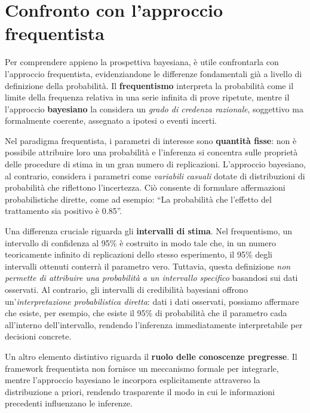 \documentclass[
  letterpaper,
  DIV=11,
  numbers=noendperiod,
  oneside]{scrreprt}
\theoremstyle{definition}
\theoremstyle{plain}
\theoremstyle{definition}
\theoremstyle{remark}
\begin{document}
\section{Confronto con l'approccio
frequentista}\label{confronto-con-lapproccio-frequentista}

Per comprendere appieno la prospettiva bayesiana, è utile confrontarla
con l'approccio frequentista, evidenziandone le differenze fondamentali
già a livello di definizione della probabilità. Il \textbf{frequentismo}
interpreta la probabilità come il limite della frequenza relativa in una
serie infinita di prove ripetute, mentre il l'approccio
\textbf{bayesiano} la considera un \emph{grado di credenza razionale},
soggettivo ma formalmente coerente, assegnato a ipotesi o eventi
incerti.

Nel paradigma frequentista, i parametri di interesse sono
\textbf{quantità fisse}: non è possibile attribuire loro una probabilità
e l'inferenza si concentra sulle proprietà delle procedure di stima in
un gran numero di replicazioni. L'approccio bayesiano, al contrario,
considera i parametri come \emph{variabili casuali} dotate di
distribuzioni di probabilità che riflettono l'incertezza. Ciò consente
di formulare affermazioni probabilistiche dirette, come ad esempio: ``La
probabilità che l'effetto del trattamento sia positivo è 0.85''.

Una differenza cruciale riguarda gli \textbf{intervalli di stima}. Nel
frequentismo, un intervallo di confidenza al 95\% è costruito in modo
tale che, in un numero teoricamente infinito di replicazioni dello
stesso esperimento, il 95\% degli intervalli ottenuti conterrà il
parametro vero. Tuttavia, questa definizione \emph{non permette di
attribuire una probabilità a un intervallo specifico} basandosi sui dati
osservati. Al contrario, gli intervalli di credibilità bayesiani offrono
un'\emph{interpretazione probabilistica diretta}: dati i dati osservati,
possiamo affermare che esiste, per esempio, che esiste il 95\% di
probabilità che il parametro cada all'interno dell'intervallo, rendendo
l'inferenza immediatamente interpretabile per decisioni concrete.

Un altro elemento distintivo riguarda il \textbf{ruolo delle conoscenze
pregresse}. Il framework frequentista non fornisce un meccanismo formale
per integrarle, mentre l'approccio bayesiano le incorpora esplicitamente
attraverso la distribuzione a priori, rendendo trasparente il modo in
cui le informazioni precedenti influenzano le inferenze.
\end{document}
